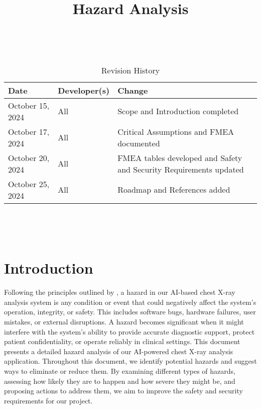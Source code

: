 \documentclass{article}
\title{Hazard Analysis\\\progname}
\author{\authname}
\date{}
\begin{document}
\maketitle
\thispagestyle{empty}

~\newpage


\begin{table}[hp]
    \caption{Revision History} \label{TblRevisionHistory}
\begin{tabularx}{\textwidth}{llX}
\toprule
\textbf{Date} & \textbf{Developer(s)} & \textbf{Change} \\
\midrule
October 15, 2024 & All & Scope and Introduction completed \\
October 17, 2024 & All & Critical Assumptions and FMEA documented \\
October 20, 2024 & All & FMEA tables developed and Safety and Security Requirements updated \\
October 25, 2024 & All & Roadmap and References added \\
\bottomrule
\end{tabularx}
\end{table}
    
~\newpage

\tableofcontents

~\newpage



\section{Introduction}

Following the principles outlined by \cite{leveson2011}, a hazard in our AI-based chest X-ray analysis system is any condition or event that could negatively affect the system's operation, integrity, or safety. This includes software bugs, hardware failures, user mistakes, or external disruptions. A hazard becomes significant when it might interfere with the system's ability to provide accurate diagnostic support, protect patient confidentiality, or operate reliably in clinical settings.
\newline
This document presents a detailed hazard analysis of our AI-powered chest X-ray analysis application. Throughout this document, we identify potential hazards and suggest ways to eliminate or reduce them. By examining different types of hazards, assessing how likely they are to happen and how severe they might be, and proposing actions to address them, we aim to improve the safety and security requirements for our project.
\end{document}
